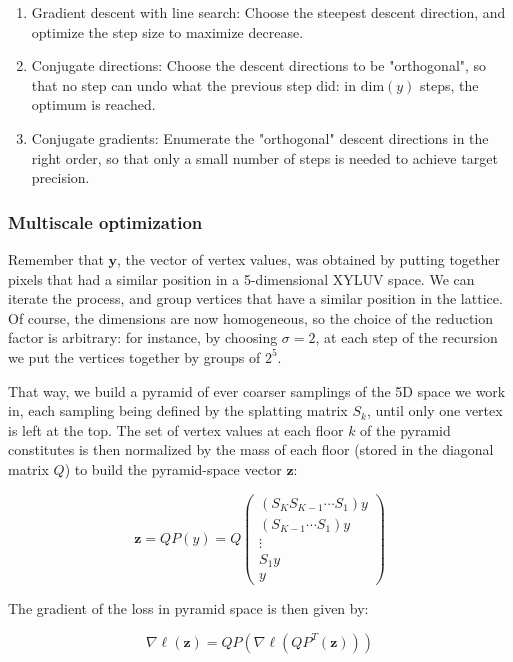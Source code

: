 \documentclass{article}
\begin{document}
\begin{enumerate}
    \item Gradient descent with line search: Choose the steepest descent direction, and optimize the step size to maximize decrease.
    \item Conjugate directions: Choose the descent directions to be "orthogonal", so that no step can undo what the previous step did: in $\text{dim}(y)$ steps, the optimum is reached.
    \item Conjugate gradients: Enumerate the "orthogonal" descent directions in the right order, so that only a small number of steps is needed to achieve target precision.
\end{enumerate}

\subsubsection{Multiscale optimization}

Remember that $\textbf{y}$, the vector of vertex values, was obtained by putting together pixels that had a similar position in a 5-dimensional XYLUV space. We can iterate the process, and group vertices that have a similar position in the lattice.
Of course, the dimensions are now homogeneous, so the choice of the reduction factor is arbitrary: for instance, by choosing $\sigma = 2$, at each step of the recursion we put the vertices together by groups of $2^5$.

That way, we build a pyramid of ever coarser samplings of the 5D space we work in, each sampling being defined by the splatting matrix $S_k$, until only one vertex is left at the top. The set of vertex values at each floor $k$ of the pyramid constitutes is then normalized by the mass of each floor (stored in the diagonal matrix $Q$) to build the pyramid-space vector $\textbf{z}$:

\begin{equation}
    \textbf{z} = QP(y) = Q\begin{pmatrix}
    (S_K S_{K-1} \cdots S_1) y \\
    (S_{K-1} \cdots S_1) y \\
    \vdots \\
    S_1 y \\
    y
    \end{pmatrix}
\end{equation}

The gradient of the loss in pyramid space is then given by:

\begin{equation}
    \nabla \ell(\textbf{z}) = QP (\nabla \ell (Q P^T (\textbf{z})))
\end{equation}
\end{document}

